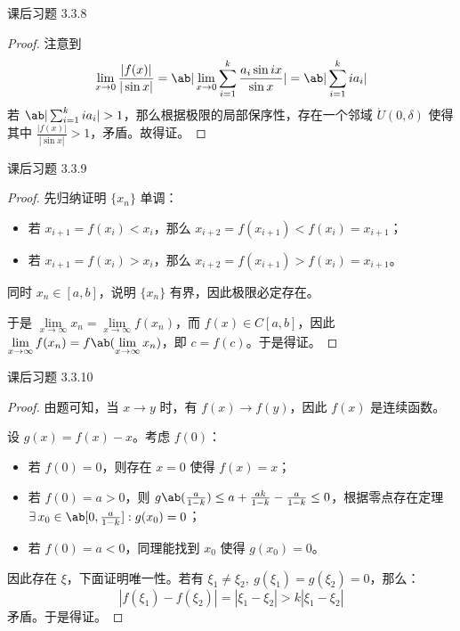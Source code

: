 \begin{problem}
	课后习题 3.3.8

	\begin{proof}
		注意到
		$$
		\lim_{x \to 0} \frac{|f(x)|}{|\sin x|} = \ab|\lim_{x \to 0} \sum_{i=1}^k \frac{a_i \sin ix}{\sin x}| = \ab|\sum_{i=1}^k i a_i|
		$$
		若 $\ab|\sum_{i=1}^k i a_i| > 1$，那么根据极限的局部保序性，存在一个邻域 $\mathring{U}(0, \delta)$ 使得其中 $\frac{|f(x)|}{|\sin x|} > 1$，矛盾。故得证。
	\end{proof}
\end{problem}

\begin{problem}
	课后习题 3.3.9

	\begin{proof}
		先归纳证明 $\{x_n\}$ 单调：

		\begin{itemize}
			\item 若 $x_{i+1} = f(x_i) < x_i$，那么 $x_{i+2} = f(x_{i+1}) < f(x_i) = x_{i+1}$；
			\item 若 $x_{i+1} = f(x_i) > x_i$，那么 $x_{i+2} = f(x_{i+1}) > f(x_i) = x_{i+1}$。
		\end{itemize}

		同时 $x_n \in [a,b]$，说明 $\{x_n\}$ 有界，因此极限必定存在。

		于是 $\lim\limits_{x \to \infty} x_n = \lim\limits_{x \to \infty} f(x_n)$，而 $f(x) \in C[a,b]$，因此 $\lim\limits_{x \to \infty} f(x_n) = f\ab(\lim\limits_{x \to \infty} x_n)$，即 $c = f(c)$。于是得证。
	\end{proof}
\end{problem}

\begin{problem}
	课后习题 3.3.10

	\begin{proof}
		由题可知，当 $x \to y$ 时，有 $f(x) \to f(y)$，因此 $f(x)$ 是连续函数。

		设 $g(x) = f(x) - x$。考虑 $f(0)$：

		\begin{itemize}
			\item 若 $f(0) = 0$，则存在 $x = 0$ 使得 $f(x) = x$；
			\item 若 $f(0) = a > 0$，则 $g\ab(\frac{a}{1 - k}) \le a + \frac{a k}{1 - k} - \frac{a}{1 - k} \le 0$，根据零点存在定理 $\exists\,x_0 \in \ab[0, \frac{a}{1 - k}]: g(x_0) = 0$；
			\item 若 $f(0) = a < 0$，同理能找到 $x_0$ 使得 $g(x_0) = 0$。
		\end{itemize}

		因此存在 $\xi$，下面证明唯一性。若有 $\xi_1 \neq \xi_2,\ g(\xi_1) = g(\xi_2) = 0$，那么：
		$$
		|f(\xi_1) - f(\xi_2)| = |\xi_1 - \xi_2| > k|\xi_1 - \xi_2|
		$$
		矛盾。于是得证。
	\end{proof}
\end{problem}

